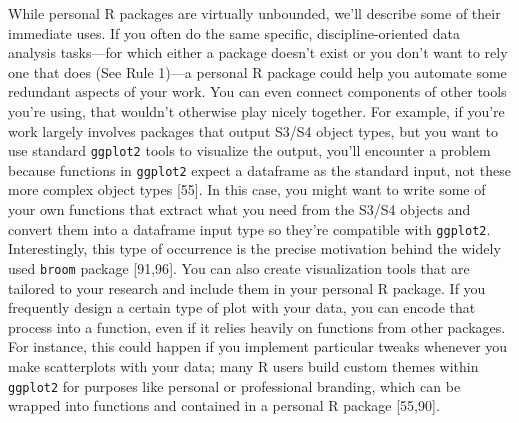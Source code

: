 \documentclass[10pt,letterpaper]{article}
\begin{document}
While personal R packages are virtually unbounded, we'll describe some
of their immediate uses. If you often do the same specific,
discipline-oriented data analysis tasks---for which either a package
doesn't exist or you don't want to rely one that does (See Rule 1)---a
personal R package could help you automate some redundant aspects of
your work. You can even connect components of other tools you're using,
that wouldn't otherwise play nicely together. For example, if you're
work largely involves packages that output S3/S4 object types, but you
want to use standard \texttt{ggplot2} tools to visualize the output,
you'll encounter a problem because functions in \texttt{ggplot2} expect
a dataframe as the standard input, not these more complex object types
{[}55{]}. In this case, you might want to write some of your own
functions that extract what you need from the S3/S4 objects and convert
them into a dataframe input type so they're compatible with
\texttt{ggplot2}. Interestingly, this type of occurrence is the precise
motivation behind the widely used \texttt{broom} package {[}91,96{]}.
You can also create visualization tools that are tailored to your
research and include them in your personal R package. If you frequently
design a certain type of plot with your data, you can encode that
process into a function, even if it relies heavily on functions from
other packages. For instance, this could happen if you implement
particular tweaks whenever you make scatterplots with your data; many R
users build custom themes within \texttt{ggplot2} for purposes like
personal or professional branding, which can be wrapped into functions
and contained in a personal R package {[}55,90{]}.
\end{document}
